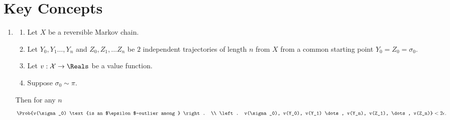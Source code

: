 \documentclass[12pt]{article}
\begin{document}
\section*{Key Concepts}
\renewcommand{\theenumii}{\arabic{enumii}}
\begin{enumerate}
    \item
        \begin{theorem}
            \label{thm:parallelsignificance:twoepstest}
            \begin{enumerate}
                \item
                    Let \( X \) be a reversible Markov chain.
                \item
                    Let \( Y_0, Y_1 \dots, Y_n \) and \( Z_0, Z_1, \dots
                    Z_n \) be \( 2 \) independent trajectories of length
                    \( n \) from \( X \) from a common starting point \(
                    Y_0 = Z_0 = \sigma_0 \).
                \item
                    Let \( v :  \mathcal{X} \to \Reals \) be a value
                    function.
                \item
                    Suppose \( \sigma_0 \sim \pi \).
            \end{enumerate}
            Then for any \( n \)
            \begin{multline*}
                \Prob{v(\sigma_0) \text{is an $\epsilon$-outlier
                    among } \right. \\
                  \left. v(\sigma_0), v(Y_0), v(Y_1) \dots, v(Y_n), v(Z_1),
                \dots, v(Z_n)} < 2 \epsilon.
            \end{multline*}


\end{theorem}
\end{enumerate}
\end{document}
